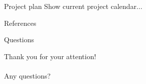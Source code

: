 \documentclass[aspectratio=169]{beamer}
\begin{document}
\begin{frame}[fragile]{Project plan}
	Show current project calendar...
\end{frame}

\begin{frame}[fragile]{References}
	\printbibliography
\end{frame}

\begin{frame}[fragile]{Questions}
	\begin{center}
		Thank you for your attention!\\
		\\
		Any questions?
	\end{center}
\end{frame}
\end{document}
